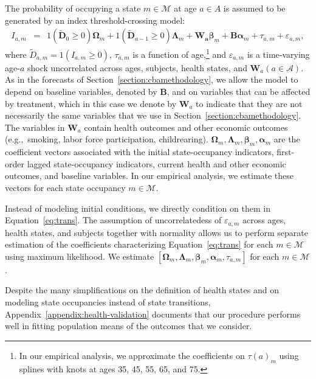 The probability of occupying a state $m \in \mathcal{M}$ at age $a \in{A}$ is assumed to be generated by an index threshold-crossing model:
\begin{eqnarray}
I_{a,m} &=&  \bm{\mathit{1}} \left( \tilde{\bm{D}}_{0} \geq 0 \right) \bm{\Omega}_{m} + \bm{\mathit{1}} \left( \tilde{\bm{D}}_{a-1} \geq 0\right) \bm{\Lambda}_{m} + \bm{W_a} \bm{\beta}_{m} + \bm{B} \bm{\alpha}_m + \tau_{a,m} + \varepsilon_{a,m}, \label{eq:trans}
\end{eqnarray}
where $\tilde{D}_{a,m} = \bm{\mathit{1}}  \left( I_{a,m} \geq 0 \right)$, $\tau_{a,m}$ is a function of age,\footnote{In our empirical analysis, we approximate the coefficients on $\tau \left( a \right)_{m}$ using splines with knots at ages 35, 45, 55, 65, and 75.} and $\varepsilon_{a,m}$ is a time-varying age-$a$ shock uncorrelated across ages, subjects, health states, and $\bm{W}_a \left( a \in \mathcal{A} \right)$. As in the forecasts of Section~\ref{section:cbamethodology}, we allow the model to depend on baseline variables, denoted by $\bm{B}$, and on variables that can be affected by treatment, which in this case we denote by $\bm{W}_a$ to indicate that they are not necessarily the same variables that we use in Section~\ref{section:cbamethodology}. The variables in $\bm{W}_a$ contain health outcomes and other economic outcomes (e.g.,\ smoking, labor force participation, childrearing). $ \bm{\Omega}_{m},  \bm{\Lambda}_{m}, \bm{\beta}_{m},  \bm{\alpha}_{m}$ are the coefficient vectors associated with the initial state-occupancy indicators, first-order lagged state-occupancy indicators, current health and other economic outcomes, and baseline variables. In our empirical analysis, we estimate these vectors for each state occupancy $m \in \mathcal{M}$.

Instead of modeling initial conditions, we directly condition on them in Equation~\eqref{eq:trans}. The assumption of uncorrelatedess of $\varepsilon_{a,m}$ across ages, health states, and subjects together with normality allows us to perform separate estimation of the coefficients characterizing Equation~\eqref{eq:trans} for each $m \in \mathcal{M}$ using maximum likelihood. We estimate $\left[   \bm{\Omega}_{m}, \bm{\Lambda}_{m}, \bm{\beta}_{m}, \bm{\alpha}_{m}, \tau_{a,m}  \right]$ for each $m \in \mathcal{M}$.

Despite the many simplifications on the definition of health states and on modeling state occupancies instead of state transitions, Appendix~\ref{appendix:health-validation} documents that our procedure performs well in fitting population means of the outcomes that we consider.

